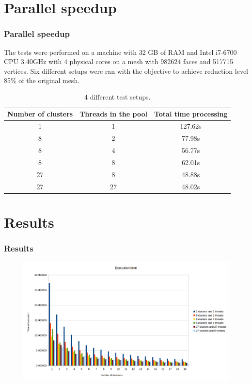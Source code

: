 \documentclass[
	10pt,
	t		%
]{beamer}
\begin{document}
\section{Parallel speedup}
\begin{frame}
\centering
\frametitle{Parallel speedup}
The tests were performed on a machine with 32 GB of RAM and Intel i7-6700 CPU 3.40GHz with 4 physical cores on a mesh with 982624 faces and 517715 vertices. Six different setups were ran with the objective to achieve reduction level 85\% of the original mesh.
\begin{table}[h!]
\centering
\begin{tabular}{ |c|c|c| } 
 \hline
 Number of clusters & Threads in the pool & Total time processing\\
 \hline
 1 & 1 & 127.62s\\
 8 & 2 & 77.98s\\
 8 & 4 & 56.77s\\
 8 & 8 & 62.01s\\
 27 & 8 & 48.88s\\
 27 & 27 & 48.02s\\
 \hline
\end{tabular}
\caption{4 different test setups.}
\end{table}
\end{frame}

\section{Results}
\begin{frame}
\frametitle{Results}
\begin{figure}[ht]
\centering
\includegraphics[width=1\textwidth]{chart}
\end{figure}
\end{frame}
\end{document}

